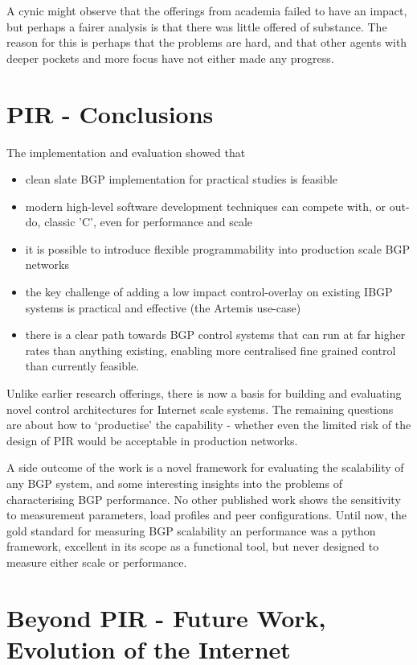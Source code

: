 A cynic might observe that the offerings from academia failed to have an impact, but perhaps a fairer analysis is that there was little offered of substance.  The reason for this is perhaps that the problems are hard, and that other agents with deeper pockets and more focus have not either made any progress.

\section{PIR - Conclusions}

The implementation and evaluation showed that 
\begin{itemize}
    \item clean slate BGP implementation for practical studies is feasible
    \item modern high-level software development techniques can compete with, or out-do, classic 'C', even for performance and scale
    \item it is possible to introduce flexible programmability into production scale BGP networks
    \item the key challenge of adding a low impact control-overlay on existing IBGP systems is practical and effective (the Artemis use-case)
    \item there is a clear path towards BGP control systems that can run at far higher rates than anything existing, enabling more centralised fine grained control than currently feasible.
\end{itemize}

Unlike earlier research offerings, there is now a basis for building and evaluating novel control architectures for Internet scale systems.
The remaining questions are about how to `productise' the capability - whether even the limited risk of the design of PIR would be acceptable in production networks.

A side outcome of the work is a novel framework for evaluating the scalability of any BGP system, and some interesting insights into the problems of characterising BGP performance.  No other published work shows the sensitivity to measurement parameters, load profiles and peer configurations.  Until now, the gold standard for measuring BGP scalability an performance was a python framework, excellent in its scope as a functional tool, but never designed to measure either scale or performance.  

\section{Beyond PIR - Future Work, Evolution of the Internet}

